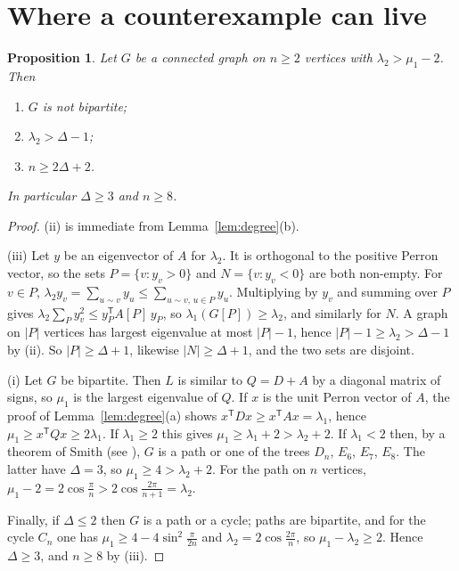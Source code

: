 \documentclass[11pt]{amsart}
\newtheorem{proposition}[theorem]{Proposition}
\theoremstyle{definition}
\theoremstyle{remark}
\newcommand{\tr}{^{\mathsf{T}}}
\begin{document}
\section{Where a counterexample can live}\label{sec:necessary}

\begin{proposition}\label{prop:necessary}
Let $G$ be a connected graph on $n\ge2$ vertices with $\lambda_2>\mu_1-2$. Then
\begin{enumerate}
\item[(i)] $G$ is not bipartite;
\item[(ii)] $\lambda_2>\Delta-1$;
\item[(iii)] $n\ge2\Delta+2$.
\end{enumerate}
In particular $\Delta\ge3$ and $n\ge8$.
\end{proposition}

\begin{proof}
(ii) is immediate from Lemma~\ref{lem:degree}(b).

(iii) Let $y$ be an eigenvector of $A$ for $\lambda_2$. It is orthogonal to the positive Perron
vector, so the sets $P=\{v:y_v>0\}$ and $N=\{v:y_v<0\}$ are both non-empty. For $v\in P$,
$\lambda_2y_v=\sum_{u\sim v}y_u\le\sum_{u\sim v,\,u\in P}y_u$. Multiplying by $y_v$ and summing
over $P$ gives $\lambda_2\sum_Py_v^2\le y_P\tr A[P]\,y_P$, so $\lambda_1(G[P])\ge\lambda_2$, and
similarly for $N$. A graph on $|P|$ vertices has largest eigenvalue at most $|P|-1$, hence
$|P|-1\ge\lambda_2>\Delta-1$ by (ii). So $|P|\ge\Delta+1$, likewise $|N|\ge\Delta+1$, and the two
sets are disjoint.

(i) Let $G$ be bipartite. Then $L$ is similar to $Q=D+A$ by a diagonal matrix of signs, so
$\mu_1$ is the largest eigenvalue of $Q$. If $x$ is the unit Perron vector of $A$, the proof of
Lemma~\ref{lem:degree}(a) shows $x\tr Dx\ge x\tr Ax=\lambda_1$, hence
$\mu_1\ge x\tr Qx\ge2\lambda_1$. If $\lambda_1\ge2$ this gives
$\mu_1\ge\lambda_1+2>\lambda_2+2$. If $\lambda_1<2$ then, by a theorem of Smith
\cite{Smith} (see \cite[Section~3.1]{BrouwerHaemers}), $G$ is a path or one of the trees
$D_n$, $E_6$, $E_7$, $E_8$. The latter have $\Delta=3$, so $\mu_1\ge4>\lambda_2+2$. For the path
on $n$ vertices, $\mu_1-2=2\cos\frac{\pi}{n}>2\cos\frac{2\pi}{n+1}=\lambda_2$.

Finally, if $\Delta\le2$ then $G$ is a path or a cycle; paths are bipartite, and for the cycle
$C_n$ one has $\mu_1\ge4-4\sin^2\frac{\pi}{2n}$ and $\lambda_2=2\cos\frac{2\pi}{n}$, so
$\mu_1-\lambda_2\ge2$. Hence $\Delta\ge3$, and $n\ge8$ by (iii).
\end{proof}
\end{document}
